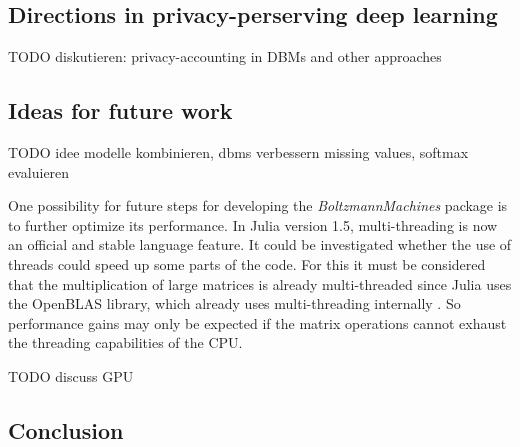 \documentclass[12pt]{article}
\newcommand{\apkg}[1]{\emph{#1}}
\begin{document}
\subsection{Directions in privacy-perserving deep learning}
TODO diskutieren: privacy-accounting in DBMs and other approaches

\subsection{Ideas for future work}
TODO idee modelle kombinieren, dbms verbessern missing values, softmax evaluieren


One possibility for future steps for developing the \apkg{BoltzmannMachines} package is to further optimize its performance.
In Julia version 1.5, multi-threading is now an official and stable language feature.
It could be investigated whether the use of threads could speed up some parts of the code.
For this it must be considered that the multiplication of large matrices is already multi-threaded since Julia uses the OpenBLAS library, which already uses multi-threading internally \citep{openblas}.
So performance gains may only be expected if the matrix operations cannot exhaust the threading capabilities of the CPU.

TODO discuss GPU




\subsection{Conclusion}

\clearpage
\appendix
\end{document}
